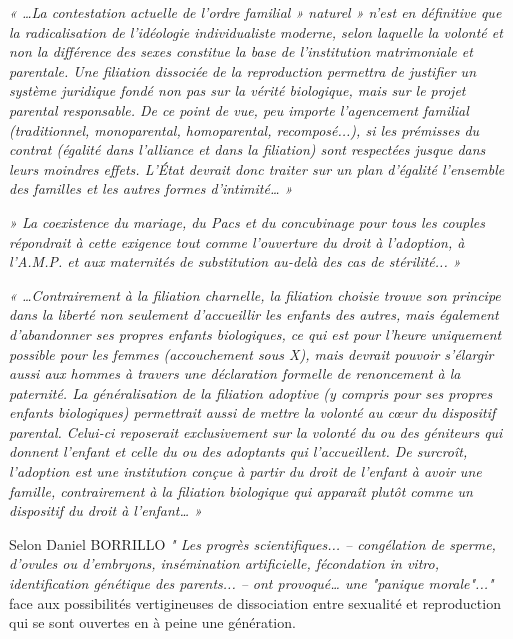  \emph{« …La contestation actuelle de l'ordre familial » naturel » n'est en définitive que la radicalisation de l'idéologie individualiste moderne, selon laquelle la volonté et non la différence des sexes constitue la base de l'institution matrimoniale et parentale. Une filiation dissociée de la reproduction permettra de justifier un système juridique fondé non pas sur la vérité biologique, mais sur le projet parental responsable. De ce point de vue, peu importe l'agencement familial (traditionnel, monoparental, homoparental, recomposé...), si les prémisses du contrat (égalité dans l'alliance et dans la filiation) sont respectées jusque dans leurs moindres effets. L'État devrait donc traiter sur un plan d'égalité l'ensemble des familles et les autres formes d'intimité… »}
 
 \emph{» La coexistence du mariage, du Pacs et du concubinage pour tous les couples répondrait à cette exigence tout comme l'ouverture du droit à l'adoption, à l'A.M.P. et aux maternités de substitution au-delà des cas de stérilité... »} 
 
 \emph{« …Contrairement à la filiation charnelle, la filiation choisie trouve son principe dans la liberté non seulement d'accueillir les enfants des autres, mais également d'abandonner ses propres enfants biologiques, ce qui est pour l'heure uniquement possible pour les femmes (accouchement sous X), mais devrait pouvoir s'élargir aussi aux hommes à travers une déclaration formelle de renoncement à la paternité. La généralisation de la filiation adoptive (y compris pour ses propres enfants biologiques) permettrait aussi de mettre la volonté au cœur du dispositif parental. Celui-ci reposerait exclusivement sur la volonté du ou des géniteurs qui donnent l'enfant et celle du ou des adoptants qui l'accueillent. De surcroît, l'adoption est une institution conçue à partir du droit de l'enfant à avoir une famille, contrairement à la filiation biologique qui apparaît plutôt comme un dispositif du droit à l'enfant… »}
 
Selon Daniel BORRILLO \emph{" Les progrès scientifiques... – congélation de sperme, d'ovules ou d'embryons, insémination artificielle, fécondation in vitro, identification génétique des parents... – ont provoqué… une "panique morale"..."}  face aux possibilités vertigineuses de dissociation entre sexualité et reproduction qui se sont ouvertes en à peine une génération. 

